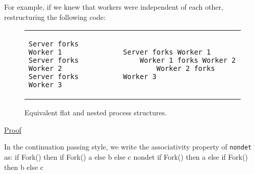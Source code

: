 \documentclass[logo,bsc,singlespacing,parskip]{infthesis}
\begin{document}
For example, if we knew that workers were independent of each other, restructuring the following code:
\vspace{-1em} %
\begin{figure}[H]
    \centering
    \begin{tabular}{p{} c p{}}
        \begin{lstlisting}
Server forks Worker 1
Server forks Worker 2
Server forks Worker 3
        \end{lstlisting}
        &
        &
        \begin{lstlisting}
Server forks Worker 1
    Worker 1 forks Worker 2
        Worker 2 forks Worker 3
        \end{lstlisting}
    \end{tabular}
    \vspace{-1em} %

    \caption{Equivalent flat and nested process structures.}
    \label{fig:process-restructuring}
\end{figure}



\underline{Proof}

In the continuation passing style, we  write the associativity property of \lstinline{nondet} as:
{
if Fork() then
if Fork() 
a 
else 
b 
else 
c
}
{nondet}
{
if Fork() then a 
else 
if Fork() 
 then b 
 else c
}
\end{document}
